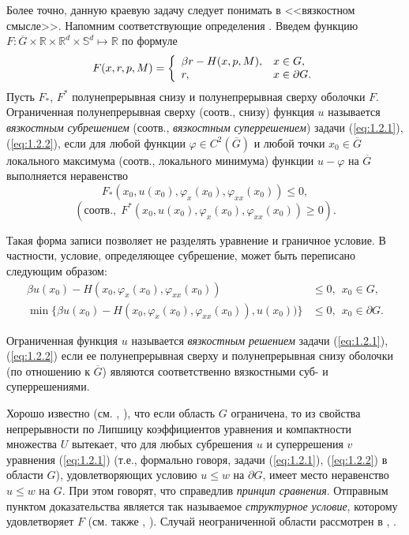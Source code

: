 Более точно, данную краевую задачу следует понимать в <<вязкостном смысле>>. Напомним соответствующие определения \cite{CraIshLio92, Pha09, Tou13, Jak10}. Введем функцию $F:\overline G\times\mathbb R\times\mathbb R^d\times\mathbb S^d\mapsto\mathbb R$ по формуле
$$ F(x,r,p,M)=\left\{\begin{array}{l l}
    \beta r-H(x,p,M), & x\in G,\\
    r, & x\in\partial G.
  \end{array} \right.$$
Пусть $F_*$, $F^*$ полунепрерывная снизу и полунепрерывная сверху оболочки $F$.
Ограниченная полунепрерывная сверху (соотв., снизу) функция $u$ называется \emph{вязкостным субрешением} (соотв., \emph{вязкостным суперрешением}) задачи (\ref{eq:1.2.1}), (\ref{eq:1.2.2}), если для любой функции $\varphi\in C^2(\overline G)$ и любой точки $x_0\in\overline G$ локального максимума (соотв., локального минимума) функции $u-\varphi$ на $\overline G$ выполняется неравенство
$$ F_*(x_0,u(x_0),\varphi_x(x_0),\varphi_{xx}(x_0)) \le 0,$$
$$ \left(\text{соотв.,}\ \ F^*(x_0,u(x_0),\varphi_x(x_0),\varphi_{xx}(x_0)) \ge 0\right). $$

Такая форма записи позволяет не разделять уравнение и граничное условие. В частности, условие, определяющее субрешение, может быть переписано следующим образом:
\begin{align*}
\beta u(x_0) - H(x_0,\varphi_x(x_0),\varphi_{xx}(x_0)) & \le 0,\ \ x_0\in G,\\
\min\{\beta u(x_0) - H(x_0,\varphi_x(x_0),\varphi_{xx}(x_0)),u(x_0))\} & \le 0,\ \
x_0\in\partial G.
\end{align*}

Ограниченная функция $u$ называется \emph{вязкостным решением} задачи (\ref{eq:1.2.1}), (\ref{eq:1.2.2}) если ее полунепрерывная сверху и полунепрерывная снизу оболочки (по отношению к $\overline G$) являются соответственно вязкостными суб- и суперрешениями.

Хорошо известно (см. \cite[следствие 5.11]{Jen89}, \cite[раздел 1.1]{BarBot98}), что если область $G$ ограничена, то из свойства непрерывности по Липшицу коэффициентов уравнения и компактности множества $U$ вытекает, что для любых субрешения $u$ и суперрешения $v$ уравнения (\ref{eq:1.2.1}) (т.е., формально говоря, задачи (\ref{eq:1.2.1}), (\ref{eq:1.2.2}) в области $G$), удовлетворяющих условию $u\le w$ на $\partial G$, имеет место неравенство $u\le w$ на $G$. При этом говорят, что справедлив \emph{принцип сравнения}. Отправным пунктом доказательства является так называемое \emph{структурное условие}, которому удовлетворяет $F$ (см. также \cite{CraIshLio92}, \cite[предположение 6.20]{Tou13}). Случай неограниченной области рассмотрен в \cite[теорема 7.3]{Ish89}, \cite[теорема 6.21]{Tou13}.

